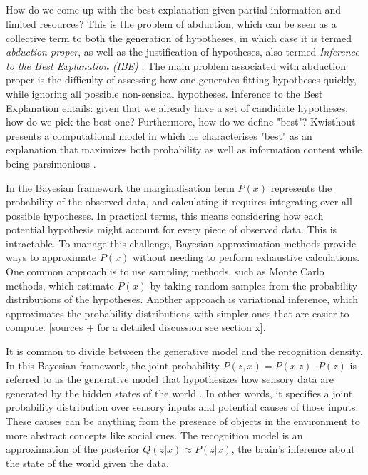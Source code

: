 \subsection{}
How do we come up with the best explanation given partial information and limited resources? This is the problem of abduction, which can be seen as a collective term to both the generation of hypotheses, in which case it is termed \textit{abduction proper}, as well as the justification of hypotheses, also termed \textit{Inference to the Best Explanation (IBE)} \cite{burks1946peirce}.
The main problem associated with abduction proper is the difficulty of assessing how one generates fitting hypotheses quickly, while ignoring all possible non-sensical hypotheses.
Inference to the Best Explanation entails: given that we already have a set of candidate hypotheses, how do we pick the best one? Furthermore, how do we define "best"? Kwisthout presents a computational model in which he characterises "best" as an explanation that maximizes both probability as well as information content while being parsimonious \cite{kwisthout2013most}.

In the Bayesian framework the marginalisation term \( P(x) \) represents the probability of the observed data, and calculating it requires integrating over all possible hypotheses. In practical terms, this means considering how each potential hypothesis might account for every piece of observed data. This is intractable. To manage this challenge, Bayesian approximation methods provide ways to approximate \( P(x) \) without needing to perform exhaustive calculations. One common approach is to use sampling methods, such as Monte Carlo methods, which estimate 
\( P(x) \) by taking random samples from the probability distributions of the hypotheses. Another approach is variational inference, which approximates the probability distributions with simpler ones that are easier to compute. [sources + for a detailed discussion see section x]. 

It is common to divide between the generative model and the recognition density.
In this Bayesian framework, the joint probability \( P(z, x) = P(x \vert z) \cdot P(z) \) is referred to as the generative model that hypothesizes how sensory data are generated by the hidden states of the world \cite{Ramstead_Kirchhoff_Friston_2020}. In other words, it specifies a joint probability distribution over sensory inputs and potential causes of those inputs. These causes can be anything from the presence of objects in the environment to more abstract concepts like social cues.
The recognition model is an approximation of the posterior \(Q(z \vert x) \approx P(z \vert x) \), the brain's inference about the state of the world given the data.

